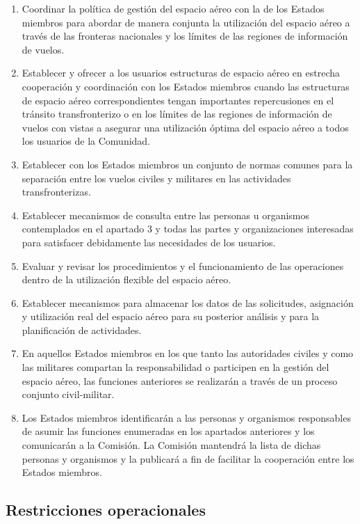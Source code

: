 \begin{enumerate}
    \item Coordinar la política de gestión del espacio aéreo con la de los Estados miembros para abordar de manera conjunta la utilización del espacio aéreo a través de las fronteras nacionales y los límites de las regiones de información de vuelos.
    \item Establecer y ofrecer a los usuarios estructuras de espacio aéreo en estrecha cooperación y coordinación con los Estados miembros cuando las estructuras de espacio aéreo correspondientes tengan importantes repercusiones en el tránsito transfronterizo o en los límites de las regiones de información de vuelos con vistas a asegurar una utilización óptima del espacio aéreo a todos los usuarios de la Comunidad.
    \item Establecer con los Estados miembros un conjunto de normas comunes para la separación entre los vuelos civiles y militares en las actividades transfronterizas.
    \item Establecer mecanismos de consulta entre las personas u organismos contemplados en el apartado 3 y todas las partes y organizaciones interesadas para satisfacer debidamente las necesidades de los usuarios.
    \item Evaluar y revisar los procedimientos y el funcionamiento de las operaciones dentro de la utilización flexible del espacio aéreo.
    \item Establecer mecanismos para almacenar los datos de las solicitudes, asignación y utilización real del espacio aéreo para su posterior análisis y para la planificación de actividades.
    \item En aquellos Estados miembros en los que tanto las autoridades civiles y como las militares compartan la responsabilidad o participen en la gestión del espacio aéreo, las funciones anteriores se realizarán a través de un proceso conjunto civil-militar.
    \item Los Estados miembros identificarán a las personas y organismos responsables de asumir las funciones enumeradas en los apartados anteriores y los comunicarán a la Comisión. La Comisión mantendrá la lista de dichas personas y organismos y la publicará a fin de facilitar la cooperación entre los Estados miembros.
\end{enumerate}

\subsection{Restricciones operacionales}

